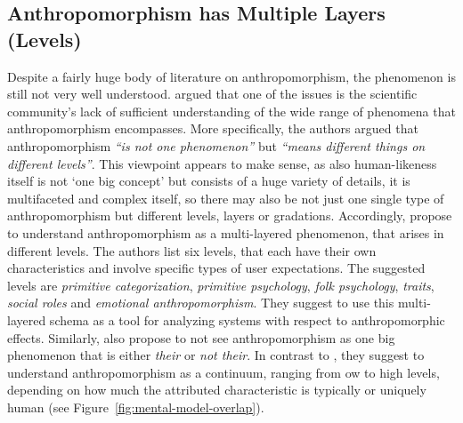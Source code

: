 \documentclass{frontiersSCNS} %
\begin{document}
%
%
%
%
%
%

\subsection{Anthropomorphism has Multiple Layers (Levels)}
\label{sec:multiple-layers} 

Despite a fairly huge body of literature on anthropomorphism, the phenomenon is still not very well understood. \cite{persson_anthropomorphism_2000} argued that one of the issues is the scientific community's lack of sufficient understanding of the wide range of phenomena that anthropomorphism encompasses. More specifically, the authors argued that anthropomorphism \textit{``is not one phenomenon''} but \textit{``means different things on different levels''}. This viewpoint appears to make sense, as also human-likeness itself is not `one big concept' but consists of a huge variety of details, it is multifaceted and complex itself, so there may also be not just one single type of anthropomorphism but different levels, layers or gradations. Accordingly, \cite{persson_anthropomorphism_2000} propose to understand anthropomorphism as a multi-layered phenomenon, that arises in different levels. The authors list six levels, that each have their own characteristics and involve specific types of user expectations. The suggested levels are \textit{primitive categorization}, \textit{primitive psychology}, \textit{folk psychology}, \textit{traits}, \textit{social roles} and \textit{emotional anthropomorphism}. They suggest to use this multi-layered schema as a tool for analyzing systems with respect to anthropomorphic effects.
Similarly, also \cite{ruijten_introducing_2014} propose to not see anthropomorphism as one big phenomenon that is either \textit{their} or \textit{not their}. In contrast to \cite{persson_anthropomorphism_2000}, they suggest to understand anthropomorphism as a continuum, ranging from ow to high levels, depending on how much the attributed characteristic is typically or uniquely human (see Figure~\ref{fig:mental-model-overlap}).
\end{document}
